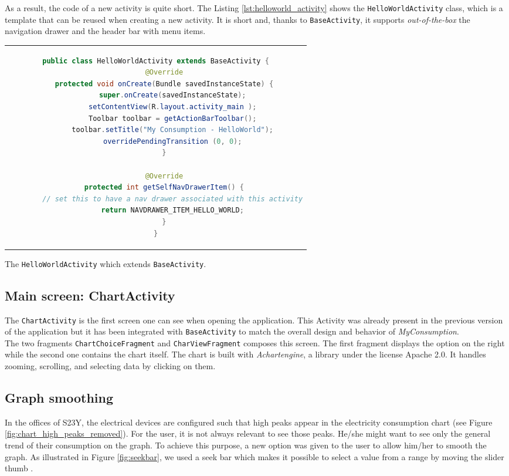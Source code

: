 \documentclass[a4paper, oneside, 11pt]{book}
\begin{document}
As a result, the code of a new activity is quite short. The Listing \ref{lst:helloworld_activity} shows the \texttt{HelloWorldActivity} class, which is a template that can be reused when creating a new activity. It is short and, thanks to \texttt{BaseActivity}, it supports \emph{out-of-the-box} the navigation drawer and the header bar with menu items.
\begin{listing}[!h]
	\centering
	\begin{tabular}{c}
		\begin{lstlisting}[language=java]
public class HelloWorldActivity extends BaseActivity {
	@Override
	protected void onCreate(Bundle savedInstanceState) {
		super.onCreate(savedInstanceState);
		setContentView(R.layout.activity_main );
		Toolbar toolbar = getActionBarToolbar();
		toolbar.setTitle("My Consumption - HelloWorld");
		overridePendingTransition (0, 0);
	}

	@Override
	protected int getSelfNavDrawerItem() {
		// set this to have a nav drawer associated with this activity
		return NAVDRAWER_ITEM_HELLO_WORLD;
	}
}
		\end{lstlisting}
	\end{tabular}
	\caption{The \texttt{HelloWorldActivity} which extends \texttt{BaseActivity}.}
	\label{lst:helloworld_activity}
\end{listing}

\subsection{Main screen: ChartActivity}
The \texttt{ChartActivity} is the first screen one can see when opening the application. This Activity was already present in the previous version of the application but it has been integrated with \texttt{BaseActivity} to match the overall design and behavior of \textit{MyConsumption}. \\

The two fragments \texttt{ChartChoiceFragment} and \texttt{CharViewFragment} composes this screen. The first fragment displays the option on the right while the second one contains the chart itself. The chart is built with \textit{Achartengine}, a library under the license Apache 2.0. It handles zooming, scrolling, and selecting data by clicking on them.

\subsection{Graph smoothing}
In the offices of S23Y, the electrical devices are configured such that high peaks appear in the electricity consumption chart (see Figure \ref{fig:chart_high_peaks_removed}). For the user, it is not always relevant to see those peaks. He/she might want to see only the general trend of their consumption on the graph. To  achieve this purpose, a new option was given to the user to allow him/her to smooth the graph. As illustrated in Figure \ref{fig:seekbar}, we used a seek bar which makes it possible to select a value from a range by moving the slider thumb \cite{seek:online}.
\end{document}
